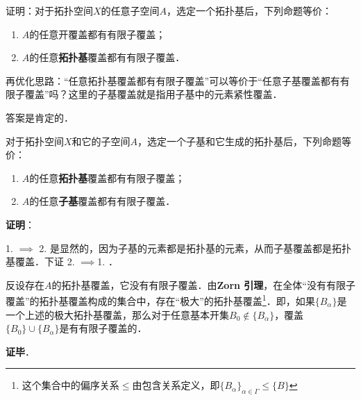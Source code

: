 \begin{exercise}{}
证明：对于拓扑空间$X$的任意子空间$A$，选定一个拓扑基后，下列命题等价：
\begin{enumerate}
\item $A$的任意开覆盖都有有限子覆盖；
\item $A$的任意\textbf{拓扑基}覆盖都有有限子覆盖．
\end{enumerate}
\end{exercise}

再优化思路：“任意拓扑基覆盖都有有限子覆盖”可以等价于“任意子基覆盖都有有限子覆盖”吗？这里的子基覆盖就是指用子基中的元素紧性覆盖．

答案是肯定的．

\begin{theorem}{}
对于拓扑空间$X$和它的子空间$A$，选定一个子基和它生成的拓扑基后，下列命题等价：
\begin{enumerate}
\item $A$的任意\textbf{拓扑基}覆盖都有有限子覆盖；
\item $A$的任意\textbf{子基}覆盖都有有限子覆盖．
\end{enumerate}
\end{theorem}

\textbf{证明}：

1. $\implies$ 2. 是显然的，因为子基的元素都是拓扑基的元素，从而子基覆盖都是拓扑基覆盖．下证 2. $\implies$1. ．

反设存在$A$的拓扑基覆盖，它没有有限子覆盖．由\textbf{Zorn 引理}，在全体“没有有限子覆盖”的拓扑基覆盖构成的集合中，存在“极大”的拓扑基覆盖\footnote{这个集合中的偏序关系$\leq$由包含关系定义，即$\{B_\alpha\}_{\alpha\in \Gamma}\leq\{B\}$}．即，如果$\{B_\alpha\}$是一个上述的极大拓扑基覆盖，那么对于任意基本开集$B_0\not\in\{B_\alpha\}$，覆盖$\{B_0\}\cup\{B_\alpha\}$是有有限子覆盖的．






\textbf{证毕}．























